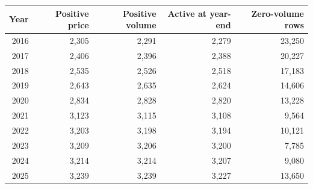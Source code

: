 {\small
\begin{tabular}{@{}rrrrr@{}}
\toprule
Year & Positive price & Positive volume & Active at year-end & Zero-volume rows \\
\midrule
2016 & 2,305 & 2,291 & 2,279 & 23,250 \\
2017 & 2,406 & 2,396 & 2,388 & 20,227 \\
2018 & 2,535 & 2,526 & 2,518 & 17,183 \\
2019 & 2,643 & 2,635 & 2,624 & 14,606 \\
2020 & 2,834 & 2,828 & 2,820 & 13,228 \\
2021 & 3,123 & 3,115 & 3,108 & 9,564 \\
2022 & 3,203 & 3,198 & 3,194 & 10,121 \\
2023 & 3,209 & 3,206 & 3,200 & 7,785 \\
2024 & 3,214 & 3,214 & 3,207 & 9,080 \\
2025 & 3,239 & 3,239 & 3,227 & 13,650 \\
\bottomrule
\end{tabular}
}
